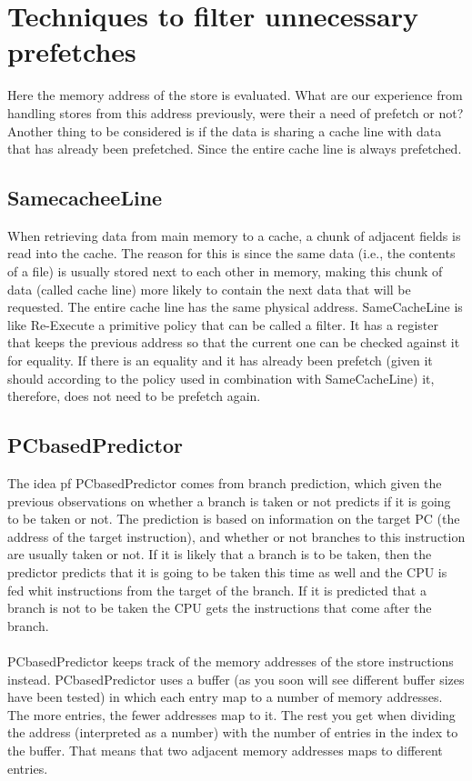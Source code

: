 \section{Techniques to filter unnecessary prefetches}
Here the memory address of the store is evaluated. What are our experience from handling stores from this address previously, were their a need of prefetch or not? Another thing to be considered is if the data is sharing a cache line with data that has already been prefetched. Since the entire cache line is always prefetched. 
 \subsection{SamecacheeLine}
When retrieving data from main memory to a cache, a chunk of adjacent fields is read into the cache. The reason for this is since the same data (i.e., the contents of a file) is usually stored next to each other in memory, making this chunk of data (called cache line) more likely to contain the next data that will be requested. The entire cache line has the same physical address. SameCacheLine is like Re-Execute a primitive policy that can be called a filter. It has a register that keeps the previous address so that the current one can be checked against it for equality. If there is an equality and it has already been prefetch (given it should according to the policy used in combination with SameCacheLine) it, therefore, does not need to be prefetch again.  
 \subsection{PCbasedPredictor}
The idea pf PCbasedPredictor comes from branch prediction, which given the previous observations on whether a branch is taken or not predicts if it is going to be taken or not. The prediction is based on information on the target PC (the address of the target instruction), and whether or not branches to this instruction are usually taken or not. If it is likely that a branch is to be taken, then the predictor predicts that it is going to be taken this time as well and the CPU is fed whit instructions from the target of the branch. If it is predicted that a branch is not to be taken the CPU gets the instructions that come after the branch. \\ \\
PCbasedPredictor keeps track of the memory addresses of the store instructions instead. PCbasedPredictor uses a buffer (as you soon will see different buffer sizes have been tested) in which each entry map to a number of memory addresses. The more entries, the fewer addresses map to it. The rest you get when dividing the address (interpreted as a number) with the number of entries in the index to the buffer. That means that two adjacent memory addresses maps to different entries.\\ \\


